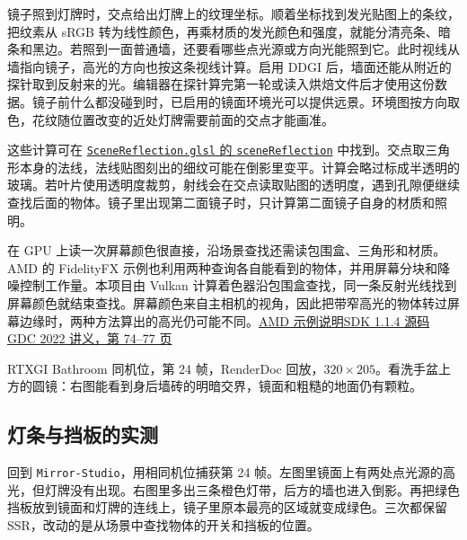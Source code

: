 镜子照到灯牌时，交点给出灯牌上的纹理坐标。顺着坐标找到发光贴图上的条纹，把纹素从 sRGB 转为线性颜色，再乘材质的发光颜色和强度，就能分清亮条、暗条和黑边。若照到一面普通墙，还要看哪些点光源或方向光能照到它。此时视线从墙指向镜子，高光的方向也按这条视线计算。启用 DDGI 后，墙面还能从附近的探针取到反射来的光。编辑器在探针算完第一轮或读入烘焙文件后才使用这份数据。镜子前什么都没碰到时，已启用的镜面环境光可以提供远景。环境图按方向取色，花纹随位置改变的近处灯牌需要前面的交点才能画准。

这些计算可在 \href{run:../../Redflag/src/Redflag/Renderer/ScreenSpace/Shaders/SceneReflection.glsl}{\texttt{SceneReflection.glsl} 的 \texttt{sceneReflection}} 中找到。交点取三角形本身的法线，法线贴图刻出的细纹可能在倒影里变平。计算会略过标成半透明的玻璃。若叶片使用透明度裁剪，射线会在交点读取贴图的透明度，遇到孔隙便继续查找后面的物体。镜子里出现第二面镜子时，只计算第二面镜子自身的材质和照明。

在 GPU 上读一次屏幕颜色很直接，沿场景查找还需读包围盒、三角形和材质。AMD 的 FidelityFX 示例也利用两种查询各自能看到的物体，并用屏幕分块和降噪控制工作量。本项目由 Vulkan 计算着色器沿包围盒查找，同一条反射光线找到屏幕颜色就结束查找。屏幕颜色来自主相机的视角，因此把带窄高光的物体转过屏幕边缘时，两种方法算出的高光仍可能不同。\href{https://gpuopen.com/manuals/fidelityfx_sdk/samples/hybrid-reflections/}{AMD 示例说明}\quad\href{https://github.com/GPUOpen-LibrariesAndSDKs/FidelityFX-SDK/blob/v1.1.4/samples/hybridreflections/shaders/Intersect.hlsl}{SDK 1.1.4 源码}\quad
\href{https://gpuopen.com/download/GDC_Performant_Reflective_Beauty_Hybrid_Ray_Traced_Reflections_In_Far_Cry_6.pdf}{GDC 2022 讲义，第 74--77 页}

{\small\color{quiet}RTXGI Bathroom 同机位，第 24 帧，RenderDoc 回放，$320\times205$。看洗手盆上方的圆镜：右图能看到身后墙砖的明暗交界，镜面和粗糙的地面仍有颗粒。\par}

\clearpage
\subsection{灯条与挡板的实测}

回到 \texttt{Mirror-Studio}，用相同机位捕获第 24 帧。左图里镜面上有两处点光源的高光，但灯牌没有出现。右图里多出三条橙色灯带，后方的墙也进入倒影。再把绿色挡板放到镜面和灯牌的连线上，镜子里原本最亮的区域就变成绿色。三次都保留 SSR，改动的是从场景中查找物体的开关和挡板的位置。

